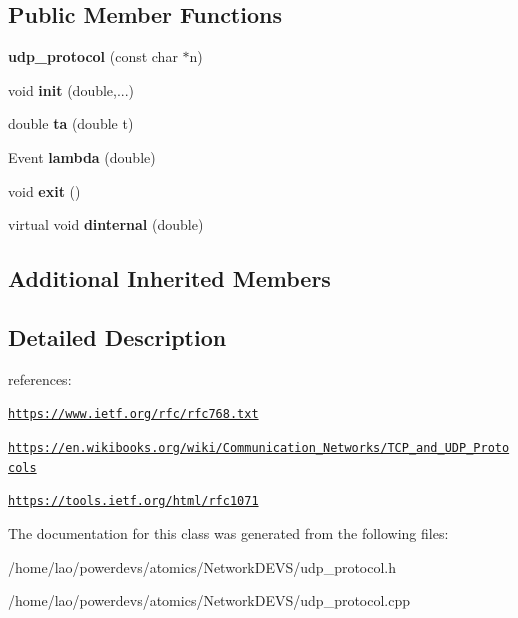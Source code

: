\subsection*{Public Member Functions}
\begin{DoxyCompactItemize}
\item 
{\bfseries udp\+\_\+protocol} (const char $\ast$n)\hypertarget{classudp__protocol_ad529c38561902f0f24188598318df947}{}\label{classudp__protocol_ad529c38561902f0f24188598318df947}

\item 
void {\bfseries init} (double,...)\hypertarget{classudp__protocol_a8fc19f814928610c72872e3637be865a}{}\label{classudp__protocol_a8fc19f814928610c72872e3637be865a}

\item 
double {\bfseries ta} (double t)\hypertarget{classudp__protocol_a5b8647bdf5061a99f99f2ff69c881c54}{}\label{classudp__protocol_a5b8647bdf5061a99f99f2ff69c881c54}

\item 
Event {\bfseries lambda} (double)\hypertarget{classudp__protocol_a98590d58898aef5a38664e1eeeac5b34}{}\label{classudp__protocol_a98590d58898aef5a38664e1eeeac5b34}

\item 
void {\bfseries exit} ()\hypertarget{classudp__protocol_a10236c5fc7df21f08c5d31f9941a69e2}{}\label{classudp__protocol_a10236c5fc7df21f08c5d31f9941a69e2}

\item 
virtual void {\bfseries dinternal} (double)\hypertarget{classudp__protocol_aab75d26186e52fc49ba9f8b88fba0071}{}\label{classudp__protocol_aab75d26186e52fc49ba9f8b88fba0071}

\end{DoxyCompactItemize}
\subsection*{Additional Inherited Members}


\subsection{Detailed Description}
references\+:
\begin{DoxyItemize}
\item \href{https://www.ietf.org/rfc/rfc768.txt}{\tt https\+://www.\+ietf.\+org/rfc/rfc768.\+txt}
\item \href{https://en.wikibooks.org/wiki/Communication_Networks/TCP_and_UDP_Protocols}{\tt https\+://en.\+wikibooks.\+org/wiki/\+Communication\+\_\+\+Networks/\+T\+C\+P\+\_\+and\+\_\+\+U\+D\+P\+\_\+\+Protocols}
\item \href{https://tools.ietf.org/html/rfc1071}{\tt https\+://tools.\+ietf.\+org/html/rfc1071} 
\end{DoxyItemize}

The documentation for this class was generated from the following files\+:\begin{DoxyCompactItemize}
\item 
/home/lao/powerdevs/atomics/\+Network\+D\+E\+V\+S/udp\+\_\+protocol.\+h\item 
/home/lao/powerdevs/atomics/\+Network\+D\+E\+V\+S/udp\+\_\+protocol.\+cpp\end{DoxyCompactItemize}
